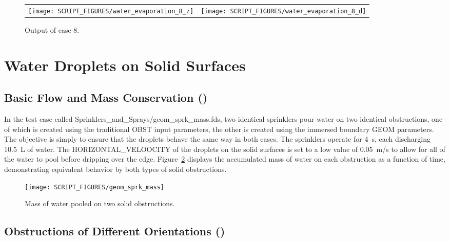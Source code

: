 \documentclass[11pt]{book}
\begin{document}
\begin{figure}[h!]
\noindent
\begin{tabular*}{\textwidth}{l@{\extracolsep{\fill}}r}
\texttt{[image: SCRIPT\_FIGURES/water\_evaporation\_8\_z]} &
\texttt{[image: SCRIPT\_FIGURES/water\_evaporation\_8\_d]}
\end{tabular*}
\caption[Sample case ]{Output of  case 8.}
\label{water_evaporation_8_plots}
\end{figure}


\section{Water Droplets on Solid Surfaces}

\subsection{Basic Flow and Mass Conservation (\texorpdfstring{{}}{geom\_sprk\_mass}) }
\label{geom_sprk_mass}

In the test case called {\ct Sprinklers\_and\_Sprays/geom\_sprk\_mass.fds}, two identical sprinklers pour water on two identical obstructions, one of which is created using the traditional {\ct OBST} input parameters, the other is created using the immersed boundary {\ct GEOM} parameters. The objective is simply to ensure that the droplets behave the same way in both cases. The sprinklers operate for 4~s, each discharging 10.5~L of water. The {\ct HORIZONTAL\_VELOOCITY} of the droplets on the solid surfaces is set to a low value of 0.05~m/s to allow for all of the water to pool before dripping over the edge. Figure~\ref{geom_sprk_mass_fig} displays the accumulated mass of water on each obstruction as a function of time, demonstrating equivalent behavior by both types of solid obstructions.
\begin{figure}[h!]
\centering
\texttt{[image: SCRIPT\_FIGURES/geom\_sprk\_mass]}
\caption[The {\ct geom\_sprk\_mass} test case]{Mass of water pooled on two solid obstructions.}
\label{geom_sprk_mass_fig}
\end{figure}

\subsection{Obstructions of Different Orientations (\texorpdfstring{{}}{geom\_particle\_cascade\_2}) }
\label{geom_particle_cascade_2}
\end{document}
